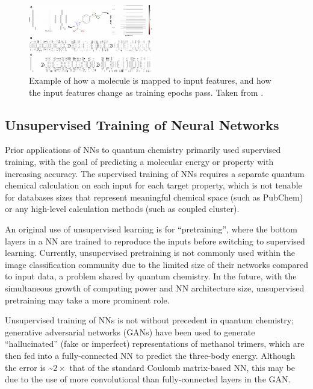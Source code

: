 \documentclass[12pt]{article}
\begin{document}
\begin{figure}
\centering
\includegraphics[width=0.48\textwidth]{10822_2016_9938_Fig8_HTML.png}
\caption{\label{fig:org972a199}
Example of how a molecule is mapped to input features, and how the input features change as training epochs pass. Taken from \parencite{Kearnes2016}.}
\end{figure}

\subsection{Unsupervised Training of Neural Networks}
\label{sec:orge56533a}

Prior applications of NNs to quantum chemistry primarily used supervised training, with the goal of predicting a molecular energy or property with increasing accuracy. The supervised training of NNs requires a separate quantum chemical calculation on each input for each target property, which is not tenable for databases sizes that represent meaningful chemical space (such as PubChem\cite{doi:10.1021/acs.jcim.7b00083}) or any high-level calculation methods (such as coupled cluster).


An original use of unsupervised learning is for ``pretraining'', where the bottom layers in a NN are trained to reproduce the inputs before switching to supervised learning. Currently, unsupervised pretraining is not commonly used within the image classification community due to the limited size of their networks compared to input data, a problem shared by quantum chemistry. In the future, with the simultaneous growth of computing power and NN architecture size, unsupervised pretraining may take a more prominent role.

Unsupervised training of NNs is not without precedent in quantum chemistry; generative adversarial networks (GANs) have been used to generate ``hallucinated'' (fake or imperfect) representations of methanol trimers, which are then fed into a fully-connected NN to predict the three-body energy\cite{doi:10.1063/1.4973380}. Although the error is \textasciitilde{}\(2\times\) that of the standard Coulomb matrix-based NN, this may be due to the use of more convolutional than fully-connected layers in the GAN.
\end{document}
